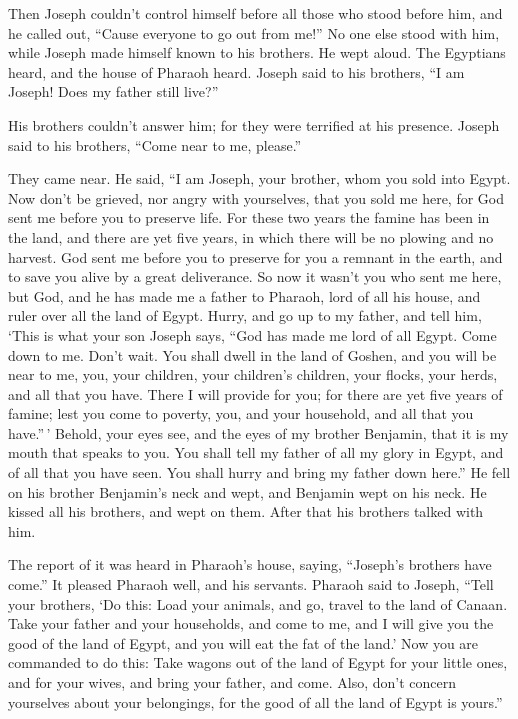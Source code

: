  Then Joseph couldn't control himself before all those who
stood before him, and he called out, ``Cause everyone to go out from
me!'' No one else stood with him, while Joseph made himself known to his
brothers.  He wept aloud. The Egyptians heard, and the house
of Pharaoh heard.  Joseph said to his brothers, ``I am
Joseph! Does my father still live?''

His brothers couldn't answer him; for they were terrified at his
presence.  Joseph said to his brothers, ``Come near to me,
please.''

They came near. He said, ``I am Joseph, your brother, whom you sold into
Egypt.  Now don't be grieved, nor angry with yourselves,
that you sold me here, for God sent me before you to preserve life.
 For these two years the famine has been in the land, and
there are yet five years, in which there will be no plowing and no
harvest.  God sent me before you to preserve for you a
remnant in the earth, and to save you alive by a great deliverance.
 So now it wasn't you who sent me here, but God, and he has
made me a father to Pharaoh, lord of all his house, and ruler over all
the land of Egypt.  Hurry, and go up to my father, and tell
him, `This is what your son Joseph says, ``God has made me lord of all
Egypt. Come down to me. Don't wait.  You shall dwell in the
land of Goshen, and you will be near to me, you, your children, your
children's children, your flocks, your herds, and all that you have.
 There I will provide for you; for there are yet five years
of famine; lest you come to poverty, you, and your household, and all
that you have.''\,'  Behold, your eyes see, and the eyes of
my brother Benjamin, that it is my mouth that speaks to you.
 You shall tell my father of all my glory in Egypt, and of
all that you have seen. You shall hurry and bring my father down here.''
 He fell on his brother Benjamin's neck and wept, and
Benjamin wept on his neck.  He kissed all his brothers, and
wept on them. After that his brothers talked with him.

 The report of it was heard in Pharaoh's house, saying,
``Joseph's brothers have come.'' It pleased Pharaoh well, and his
servants.  Pharaoh said to Joseph, ``Tell your brothers,
`Do this: Load your animals, and go, travel to the land of Canaan.
 Take your father and your households, and come to me, and
I will give you the good of the land of Egypt, and you will eat the fat
of the land.'  Now you are commanded to do this: Take
wagons out of the land of Egypt for your little ones, and for your
wives, and bring your father, and come.  Also, don't
concern yourselves about your belongings, for the good of all the land
of Egypt is yours.''

